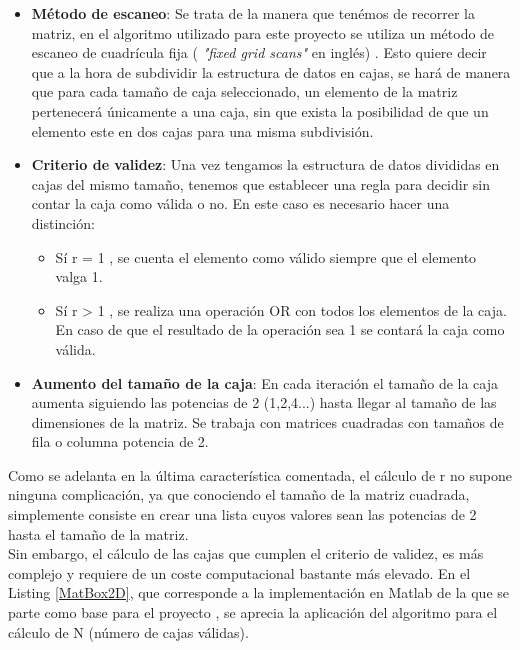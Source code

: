 \begin{itemize}
    \item \textbf{Método de escaneo}: Se trata de la manera que tenémos de recorrer la matriz, en el algoritmo utilizado para este proyecto se utiliza un método de escaneo de cuadrícula fija ( \textit{"fixed grid scans"} en inglés) \cite{unknown-author-no-dateF}. Esto quiere decir que a la hora de subdividir la estructura de datos en cajas, se hará de manera que para cada tamaño de caja seleccionado, un elemento de la matriz pertenecerá únicamente a una caja, sin que exista la posibilidad de que un elemento este en dos cajas para una misma subdivisión.
    \item \textbf{Criterio de validez}: Una vez tengamos la estructura de datos divididas en cajas del mismo tamaño, tenemos que establecer una regla para decidir sin contar la caja como válida o no. En este caso es necesario hacer una distinción:
    \begin{itemize}
        \item Sí  r = 1 , se cuenta el elemento como válido siempre que el elemento valga 1.
        \item Sí  r > 1 , se realiza una operación OR con todos los elementos de la caja. En caso de que el resultado de la operación sea 1 se contará la caja como válida. 
    \end{itemize}
    \item \textbf{Aumento del tamaño de la caja}: En cada iteración el tamaño de la caja aumenta siguiendo las potencias de 2 (1,2,4...) hasta llegar al tamaño de las dimensiones de la matriz. Se trabaja con matrices cuadradas con tamaños de fila o columna potencia de 2.
\end{itemize}


Como se adelanta en la última característica comentada, el cálculo de r no supone ninguna complicación, ya que conociendo el tamaño de la matriz cuadrada, simplemente consiste en crear una lista cuyos valores sean las potencias de 2 hasta el tamaño de la matriz.\\

Sin embargo, el cálculo de las cajas que cumplen el criterio de validez, es más complejo y requiere de un coste computacional bastante más elevado. En el Listing \ref{MatBox2D}, que corresponde a la implementación en Matlab de la que se parte como base para el proyecto \cite{unknown-author-2008}, se aprecia la aplicación del algoritmo para el cálculo de N (número de cajas válidas).\\


